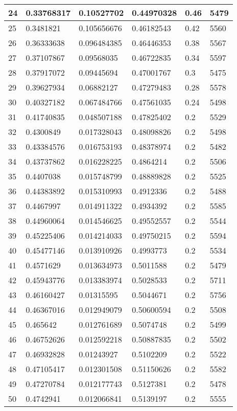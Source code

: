 \begin{longtable}{|l|l|l|l|l|l|}
24 & 0.33768317 & 0.10527702 & 0.44970328 & 0.46 & 5479 \\ \hline 
25 & 0.3481821 & 0.105656676 & 0.46182543 & 0.42 & 5560 \\ \hline 
26 & 0.36333638 & 0.096484385 & 0.46446353 & 0.38 & 5567 \\ \hline 
27 & 0.37107867 & 0.09568035 & 0.46722835 & 0.34 & 5597 \\ \hline 
28 & 0.37917072 & 0.09445694 & 0.47001767 & 0.3 & 5475 \\ \hline 
29 & 0.39627934 & 0.06882127 & 0.47279483 & 0.28 & 5578 \\ \hline 
30 & 0.40327182 & 0.067484766 & 0.47561035 & 0.24 & 5498 \\ \hline 
31 & 0.41740835 & 0.048507188 & 0.47825402 & 0.2 & 5529 \\ \hline 
32 & 0.4300849 & 0.017328043 & 0.48098826 & 0.2 & 5498 \\ \hline 
33 & 0.43384576 & 0.016753193 & 0.48378974 & 0.2 & 5482 \\ \hline 
34 & 0.43737862 & 0.016228225 & 0.4864214 & 0.2 & 5506 \\ \hline 
35 & 0.4407038 & 0.015748799 & 0.48889828 & 0.2 & 5525 \\ \hline 
36 & 0.44383892 & 0.015310993 & 0.4912336 & 0.2 & 5488 \\ \hline 
37 & 0.4467997 & 0.014911322 & 0.4934392 & 0.2 & 5585 \\ \hline 
38 & 0.44960064 & 0.014546625 & 0.49552557 & 0.2 & 5544 \\ \hline 
39 & 0.45225406 & 0.014214033 & 0.49750215 & 0.2 & 5594 \\ \hline 
40 & 0.45477146 & 0.013910926 & 0.4993773 & 0.2 & 5534 \\ \hline 
41 & 0.4571629 & 0.013634973 & 0.5011588 & 0.2 & 5479 \\ \hline 
42 & 0.45943776 & 0.013383974 & 0.5028533 & 0.2 & 5711 \\ \hline 
43 & 0.46160427 & 0.01315595 & 0.5044671 & 0.2 & 5756 \\ \hline 
44 & 0.46367016 & 0.012949079 & 0.50600594 & 0.2 & 5508 \\ \hline 
45 & 0.465642 & 0.012761689 & 0.5074748 & 0.2 & 5499 \\ \hline 
46 & 0.46752626 & 0.012592218 & 0.50887835 & 0.2 & 5502 \\ \hline 
47 & 0.46932828 & 0.01243927 & 0.5102209 & 0.2 & 5522 \\ \hline 
48 & 0.47105417 & 0.012301508 & 0.51150626 & 0.2 & 5582 \\ \hline 
49 & 0.47270784 & 0.012177743 & 0.5127381 & 0.2 & 5478 \\ \hline 
50 & 0.4742941 & 0.012066841 & 0.5139197 & 0.2 & 5555 \\ \hline 
\end{longtable}